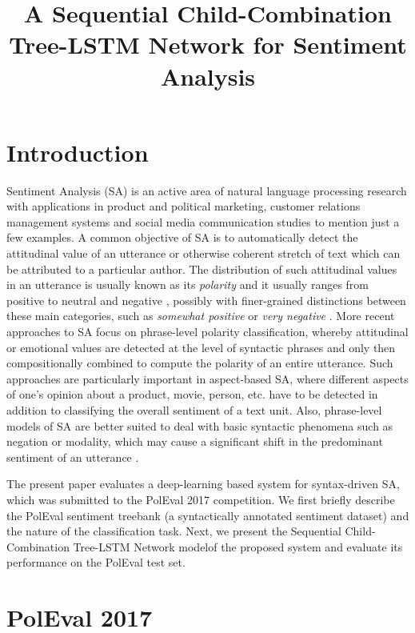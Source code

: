 \documentclass[10pt, a4paper]{article}
\title{A Sequential Child-Combination Tree-LSTM Network for Sentiment Analysis}
\begin{document}
\maketitleabstract

\section{Introduction}   
Sentiment Analysis (SA) is an active area of natural language processing research with applications in product and political marketing, customer relations management systems and social media communication studies to mention just a few examples. A common objective of SA is to automatically detect the attitudinal value of an utterance or otherwise coherent stretch of text which can be attributed to a particular author. The distribution of  such attitudinal values in an utterance is usually known as its \textit{polarity} and it usually ranges from positive to neutral and negative \cite{cambria_schuller}, possibly with finer-grained distinctions between these main categories, such as \textit{somewhat positive} or \textit{very negative} \cite{socher2013recursive}. More recent approaches to SA focus on phrase-level polarity classification, whereby attitudinal or emotional values are detected at the level of syntactic phrases and only then compositionally combined to compute the polarity of an entire utterance. Such approaches are particularly important in aspect-based SA, where different aspects of one's opinion about a product, movie, person, etc. have to be detected in addition to  classifying the overall sentiment of a text unit. Also, phrase-level models of SA are better suited to deal with basic syntactic phenomena such as negation or modality, which may cause a significant shift in the predominant sentiment of an utterance \cite{wilson_wiebe}. 
\par The present paper evaluates a deep-learning based system for syntax-driven SA, which was submitted to the PolEval 2017 competition. We first briefly describe the PolEval sentiment treebank (a syntactically annotated sentiment dataset) and the nature of the classification task. Next, we present the Sequential Child-Combination Tree-LSTM Network modelof the proposed system and evaluate its performance on the PolEval test set.


\section{PolEval 2017}
\end{document}
